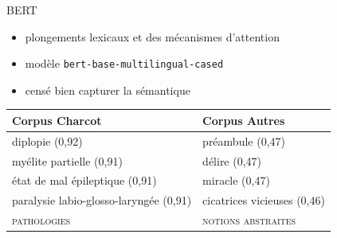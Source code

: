 \begin{frame}{\textsc{BERT}}
\cite{vaswani2021}
    \begin{itemize}
        \item plongements lexicaux et des
mécanismes d’attention
        \item modèle \texttt{bert-base-multilingual-cased}
        \item censé bien capturer la sémantique
    \end{itemize}
\begin{table}[]
\begin{tabular}{ll}
\hline
Corpus \og{}Charcot\fg{}          & Corpus \og{}Autres\fg{} \\
\hline
diplopie (0,92)                & préambule (0,47)  \\
myélite partielle (0,91)       & délire (0,47)     \\
état de mal épileptique (0,91) & miracle (0,47)   \\
paralysie labio-glosso-laryngée (0,91) &
cicatrices vicieuses (0,46) \\
\textsc{pathologies} & \textsc{notions abstraites} \\
\hline 
\end{tabular}
\end{table}
\end{frame}

